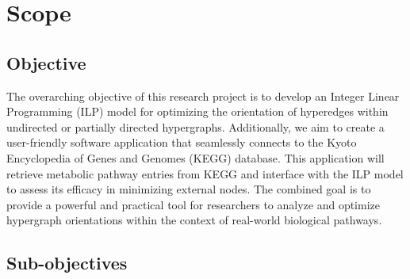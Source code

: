 \section{Scope}

\subsection{Objective}

The overarching objective of this research project is to develop an Integer Linear Programming (ILP) model for optimizing the orientation of hyperedges within undirected or partially directed hypergraphs. Additionally, we aim to create a user-friendly software application that seamlessly connects to the Kyoto Encyclopedia of Genes and Genomes (KEGG) database. This application will retrieve metabolic pathway entries from KEGG and interface with the ILP model to assess its efficacy in minimizing external nodes. The combined goal is to provide a powerful and practical tool for researchers to analyze and optimize hypergraph orientations within the context of real-world biological pathways.

\subsection{Sub-objectives}


